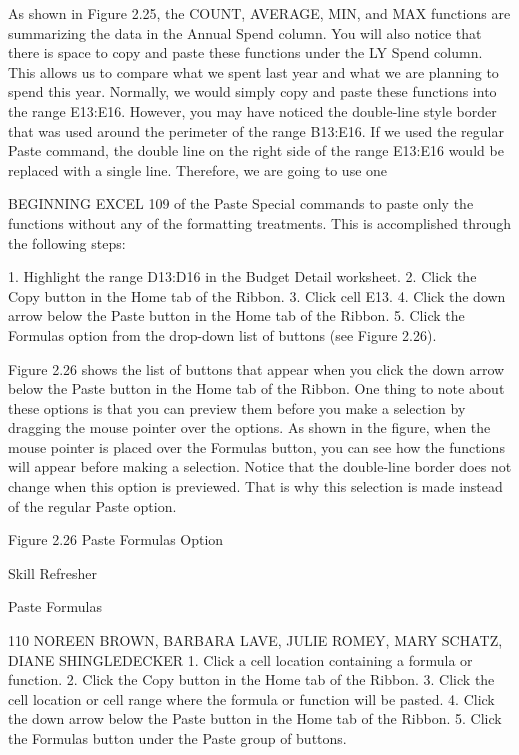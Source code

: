 As shown in Figure 2.25, the COUNT, AVERAGE, MIN, and MAX functions are summarizing the
data in the Annual Spend column. You will also notice that there is space to copy and paste these
functions under the LY Spend column. This allows us to compare what we spent last year and what we
are planning to spend this year. Normally, we would simply copy and paste these functions into the
range E13:E16. However, you may have noticed the double-line style border that was used around the
perimeter of the range B13:E16. If we used the regular Paste command, the double line on the right
side of the range E13:E16 would be replaced with a single line. Therefore, we are going to use one

BEGINNING EXCEL 109
of the Paste Special commands to paste only the functions without any of the formatting treatments.
This is accomplished through the following steps:

1.    Highlight the range D13:D16 in the Budget Detail worksheet.
2.    Click the Copy button in the Home tab of the Ribbon.
3.    Click cell E13.
4.    Click the down arrow below the Paste button in the Home tab of the Ribbon.
5.    Click the Formulas option from the drop-down list of buttons (see Figure 2.26).

Figure 2.26 shows the list of buttons that appear when you click the down arrow below the Paste
button in the Home tab of the Ribbon. One thing to note about these options is that you can preview
them before you make a selection by dragging the mouse pointer over the options. As shown in the
figure, when the mouse pointer is placed over the Formulas button, you can see how the functions
will appear before making a selection. Notice that the double-line border does not change when this
option is previewed. That is why this selection is made instead of the regular Paste option.




Figure 2.26 Paste Formulas Option




Skill Refresher


Paste Formulas



110 NOREEN BROWN, BARBARA LAVE, JULIE ROMEY, MARY SCHATZ, DIANE SHINGLEDECKER
1. Click a cell location containing a formula or function.
2. Click the Copy button in the Home tab of the Ribbon.
3. Click the cell location or cell range where the formula or function will be pasted.
4. Click the down arrow below the Paste button in the Home tab of the Ribbon.
5. Click the Formulas button under the Paste group of buttons.



